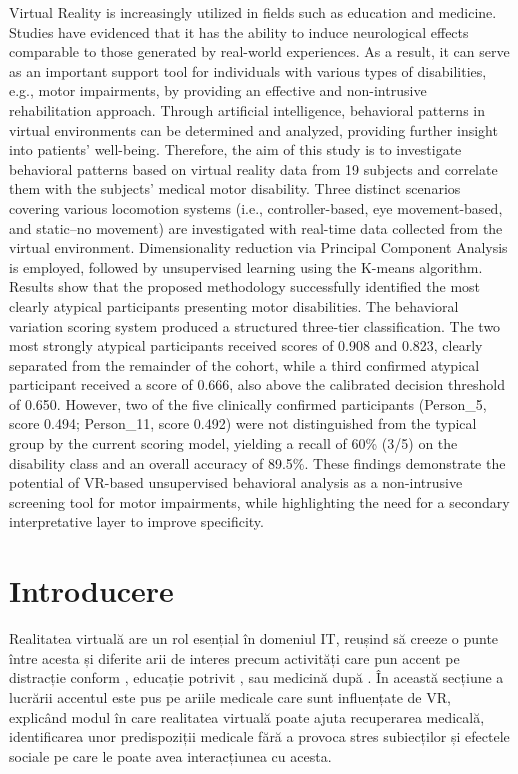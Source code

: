 \documentclass[12pt,a4paper]{report}
\theoremstyle{definition}
\theoremstyle{remark}
\begin{document}
Virtual Reality is increasingly utilized in fields such as education and medicine. Studies have evidenced that it has the ability to induce neurological effects comparable to those generated by real-world experiences. As a result, it can serve as an important support tool for individuals with various types of disabilities, e.g., motor impairments, by providing an effective and non-intrusive rehabilitation approach. Through artificial intelligence, behavioral patterns in virtual environments can be determined and analyzed, providing further insight into patients’ well-being.
Therefore, the aim of this study is to investigate behavioral patterns based on virtual reality data from 19 subjects and correlate them with the subjects’ medical motor disability. Three distinct scenarios covering various locomotion systems (i.e., controller-based, eye movement-based, and static–no movement) are investigated with real-time data collected from the virtual environment. Dimensionality reduction via Principal Component Analysis is employed, followed by unsupervised learning using the K-means algorithm.
Results show that the proposed methodology successfully identified the most clearly atypical participants presenting motor disabilities. The behavioral variation scoring system produced a structured three-tier classification. The two most strongly atypical participants received scores of 0.908 and 0.823, clearly separated from the remainder of the cohort, while a third confirmed atypical participant received a score of 0.666, also above the calibrated decision threshold of 0.650. However, two of the five clinically confirmed participants (Person\_5, score 0.494; Person\_11, score 0.492) were not distinguished from the typical group by the current scoring model, yielding a recall of 60\% (3/5) on the disability class and an overall accuracy of 89.5\%. These findings demonstrate the potential of VR-based unsupervised behavioral analysis as a non-intrusive screening tool for motor impairments, while highlighting the need for a secondary interpretative layer to improve specificity.

\tableofcontents
\newpage

\chapter{Introducere}

Realitatea virtuală are un rol esențial în domeniul IT, reușind să creeze o punte între acesta și diferite arii de interes precum activități care pun accent pe distracție conform \cite{Samadbeik2018}, educație potrivit \cite{Lege2020}, \cite{Powell2017} sau medicină după \cite{Szekely1999}. În această secțiune a lucrării accentul este pus pe ariile medicale care sunt influențate de VR, explicând modul în care realitatea virtuală poate ajuta recuperarea medicală, identificarea unor predispoziții medicale fără a provoca stres subiecților și efectele sociale pe care le poate avea interacțiunea cu acesta. 
\end{document}

